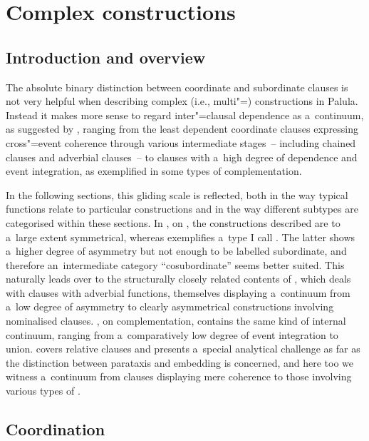 \chapter{Complex constructions}
\label{chap:13}

\section{Introduction and overview}
\label{sec:13-1}


The absolute binary distinction between coordinate and subordinate clauses is not very helpful when describing complex (i.e., multi"=) constructions in Palula. Instead it makes more sense to regard inter"=clausal dependence as a~continuum, as suggested by \citet[327--328]{givon2001b}, ranging from the least dependent coordinate clauses expressing cross"=event coherence through various intermediate stages~-- including chained clauses and adverbial clauses~-- to clauses with a~high degree of dependence and event integration, as exemplified in some types of complementation.



In the following sections, this gliding scale is reflected, both in the way typical functions relate to particular constructions and in the way different subtypes are categorised within these sections. In , on , the constructions described are to a~large extent symmetrical, whereas  exemplifies a~type I call . The latter shows a~higher degree of asymmetry but not enough to be labelled subordinate, and therefore an~intermediate category ``cosubordinate'' seems better suited. This naturally leads over to the structurally closely related contents of , which deals with clauses with adverbial functions, themselves displaying a~continuum from a~low degree of asymmetry to clearly asymmetrical constructions involving nominalised clauses. , on complementation, contains the same kind of internal continuum, ranging from a~comparatively low degree of event integration to  union.  covers relative clauses and presents a~special analytical challenge as far as the distinction between parataxis and embedding is concerned, and here too we witness a~continuum from clauses displaying mere  coherence to those involving various types of .


\section{Coordination}
\label{sec:13-2}

